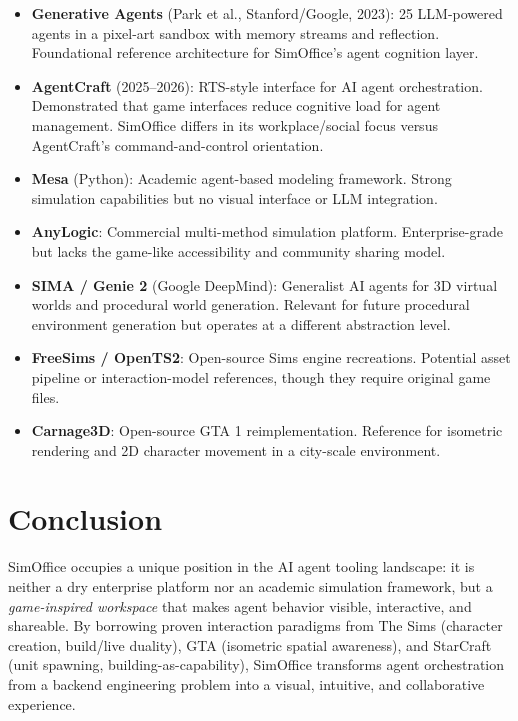 \documentclass[11pt,letterpaper]{article}
\begin{document}
\begin{itemize}[leftmargin=2em]
  \item \textbf{Generative Agents} (Park et al., Stanford/Google, 2023): 25 LLM-powered agents in a pixel-art sandbox with memory streams and reflection. Foundational reference architecture for SimOffice's agent cognition layer.

  \item \textbf{AgentCraft} (2025--2026): RTS-style interface for AI agent orchestration. Demonstrated that game interfaces reduce cognitive load for agent management. SimOffice differs in its workplace/social focus versus AgentCraft's command-and-control orientation.

  \item \textbf{Mesa} (Python): Academic agent-based modeling framework. Strong simulation capabilities but no visual interface or LLM integration.

  \item \textbf{AnyLogic}: Commercial multi-method simulation platform. Enterprise-grade but lacks the game-like accessibility and community sharing model.

  \item \textbf{SIMA / Genie 2} (Google DeepMind): Generalist AI agents for 3D virtual worlds and procedural world generation. Relevant for future procedural environment generation but operates at a different abstraction level.

  \item \textbf{FreeSims / OpenTS2}: Open-source Sims engine recreations. Potential asset pipeline or interaction-model references, though they require original game files.

  \item \textbf{Carnage3D}: Open-source GTA 1 reimplementation. Reference for isometric rendering and 2D character movement in a city-scale environment.
\end{itemize}


\section{Conclusion}

SimOffice occupies a unique position in the AI agent tooling landscape: it is neither a dry enterprise platform nor an academic simulation framework, but a \emph{game-inspired workspace} that makes agent behavior visible, interactive, and shareable. By borrowing proven interaction paradigms from The Sims (character creation, build/live duality), GTA (isometric spatial awareness), and StarCraft (unit spawning, building-as-capability), SimOffice transforms agent orchestration from a backend engineering problem into a visual, intuitive, and collaborative experience.
\end{document}
